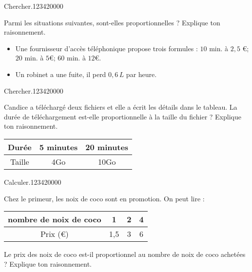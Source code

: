 \begin{pageParcoursu} 

\begin{ExoCd}{Chercher.}{1234}{2}{0}{0}{0}{0}
 
Parmi les situations suivantes, sont-elles proportionnelles ? Explique ton raisonnement.
\begin{itemize}[leftmargin=*]
 \item Une fournisseur d'accès téléphonique propose trois formules : $10$ min. à $2,5$ \euro ; $20$  min. à $5$\euro ; $60$  min. à $12$\euro. 
 \item Un robinet a une fuite, il perd $0,6\,L$ par heure. 
\end{itemize}


\end{ExoCd}


\begin{ExoCd}{Chercher.}{1234}{2}{0}{0}{0}{0}

Candice a téléchargé deux fichiers et elle a écrit les détails dans le tableau. La durée de téléchargement est-elle proportionnelle à la taille du fichier ? Explique ton raisonnement.

\begin{center}
\begin{tabular}{|c|c|c|}
\hline 
Durée & 5 minutes & 20 minutes \\ 
\hline 
Taille & 4Go & 10Go  \\ 
\hline 
\end{tabular} 
\end{center}
 
\end{ExoCd}


\begin{ExoCd}{Calculer.}{1234}{2}{0}{0}{0}{0}

Chez le primeur, les noix de coco sont en promotion. On peut lire :
\begin{center}
\begin{tabular}{|c|c|c|c|}
\hline 
nombre de noix de coco& 1 & 2 & 4 \\ 
\hline 
Prix (\euro) & 1,5 & 3  & 6  \\ 
\hline 
\end{tabular} 
\end{center}
Le prix des  noix de coco est-il proportionnel au nombre de  noix de coco achetées ? Explique ton raisonnement.
 

\end{ExoCd}
\end{pageParcoursu}
